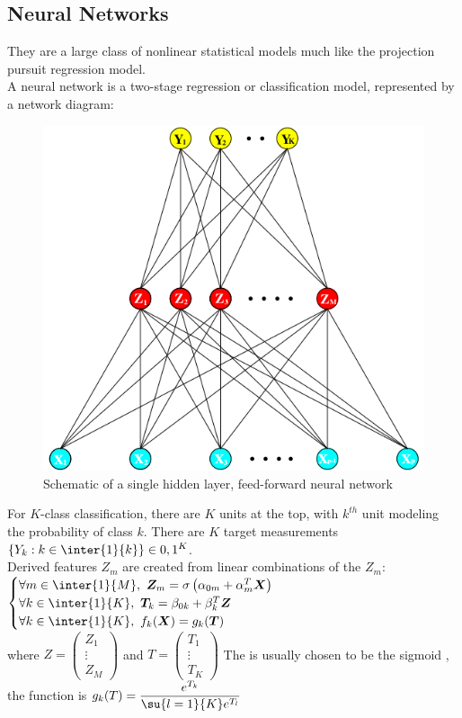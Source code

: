 \subsection{Neural Networks}
They are a large class of nonlinear statistical models much like the projection pursuit regression
model.\\
A neural network is a two-stage regression or classification model, represented by a network diagram:
\begin{figure}[H]
	\begin{center}
		\includegraphics[width=.7\textwidth]{./chap/1chap/99sec/images/2_networkDiag.png}
	\end{center}
	\caption{Schematic of a single hidden layer, feed-forward neural network}
	\label{fig:99_2_networkDiag}
\end{figure}

For $K$-class classification, there are $K$ units at the top, with $k^{th}$ unit modeling the 
probability of class $k$. There are $K$ target measurements $\left\{Y_{k}:k\in\inter{1}{k}\right\}
\in {0, 1}^{K}$.\\
Derived features $Z_{m}$ are created from linear combinations of the $Z_{m}$:\\
$
\begin{cases}
	\forall m\in\inter{1}{M},~\bm{Z}_{m} = \sigma\left(\alpha_{0m}+\alpha_{m}^{T}\bm{X}\right)\\
	\forall k\in\inter{1}{K},~\bm{T}_{k} = \beta_{0k} + \beta_{k}^{T}\bm{Z}\\
	\forall k\in\inter{1}{K},~f_{k}(\bm{X}) = g_{k}(\bm{T})
\end{cases}
$\\
where 
$
Z =
\begin{pmatrix}
	Z_{1}\\
	\vdots\\
	Z_{M}
\end{pmatrix}
$ and 
$
T =
\begin{pmatrix}
	T_{1}\\
	\vdots\\
	T_{K}
\end{pmatrix}
$ 
The  is usually chosen to be the sigmoid , the  function is $g_{k}(T)=\dfrac{e^{T_{k}}}{\su{{l=1}}{K}e^{T_{l}}}$
